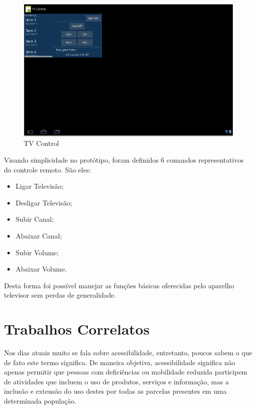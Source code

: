 \documentclass[12pt,a4paper,oneside]{report}
\begin{document}
\begin{figure}[htbp]
   \centering
    \includegraphics[width=1\textwidth]{figuras/tv_control}
    \caption{TV Control}
    \label{fig:tv-control}
\end{figure}

Visando simplicidade no protótipo, foram definidos 6 comandos representativos do controle remoto. São eles:
\begin{itemize}
    \item Ligar Televisão;
    \item Desligar Televisão;
    \item Subir Canal;
    \item Abaixar Canal;
    \item Subir Volume;
    \item Abaixar Volume.
\end{itemize}

Desta forma foi possível manejar as funções básicas oferecidas pelo aparelho televisor sem perdas de generalidade.

\chapter{Trabalhos Correlatos}
\label{chap:trabalhos-correlatos}

Nos dias atuais muito se fala sobre acessibilidade, entretanto, poucos sabem o que de fato este termo significa. De maneira objetiva, acessibilidade significa não apenas permitir que pessoas com deficiências ou mobilidade reduzida participem de atividades que incluem o uso de produtos, serviços e informação, mas a inclusão e extensão do uso destes por todas as parcelas presentes em uma determinada população.
\end{document}
